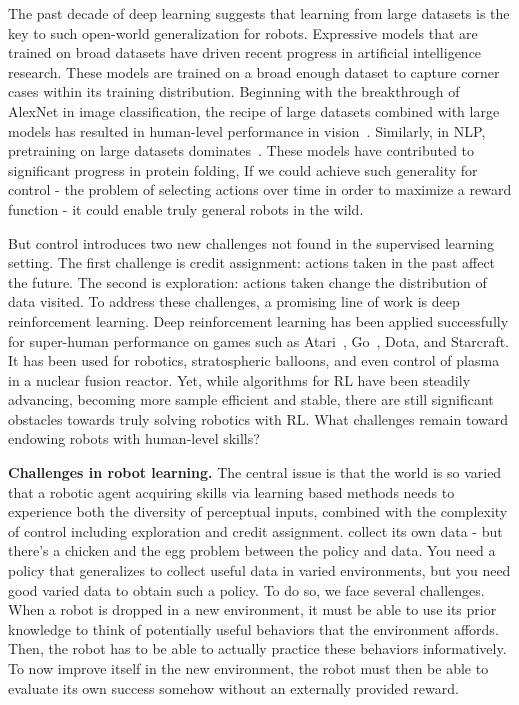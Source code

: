 The past decade of deep learning suggests that learning from large datasets is the key to such open-world generalization for robots.
Expressive models that are trained on broad datasets have driven recent progress in artificial intelligence research.
These models are trained on a broad enough dataset to capture corner cases within its training distribution.
Beginning with the breakthrough of AlexNet in image classification, the recipe of large datasets combined with large models has resulted in human-level performance in vision~\citep{krizhevsky2012imagenet}.
Similarly, in NLP, pretraining on large datasets dominates~\citep{devlin2019bert}.
These models have contributed to significant progress in protein folding, 
If we could achieve such generality for control - the problem of selecting actions over time in order to maximize a reward function - it could enable truly general robots in the wild.

But control introduces two new challenges not found in the supervised learning setting.
The first challenge is credit assignment: actions taken in the past affect the future.
The second is exploration: actions taken change the distribution of data visited.
To address these challenges, a promising line of work is deep reinforcement learning.
Deep reinforcement learning has been applied successfully for super-human performance on games such as Atari~\citep{mnih2015human}, Go~\citep{silver2016alphago}, Dota, and Starcraft.
It has been used for robotics, stratospheric balloons, and even control of plasma in a nuclear fusion reactor.
Yet, while algorithms for RL have been steadily advancing, becoming more sample efficient and stable, there are still significant obstacles towards truly solving robotics with RL.
What challenges remain toward endowing robots with human-level skills?

\vspace{5mm}

\textbf{Challenges in robot learning.} The central issue is that the world is so varied that a robotic agent acquiring skills via learning based methods needs to experience both the diversity of perceptual inputs, combined with the complexity of control including exploration and credit assignment.
collect its own data - but there’s a chicken and the egg problem between the policy and data. You need a policy that generalizes to collect useful data in varied environments, but you need good varied data to obtain such a policy. 
To do so, we face several challenges. When a robot is dropped in a new environment, it must be able to use its prior knowledge to think of potentially useful behaviors that the environment affords. Then, the robot has to be able to actually practice these behaviors informatively. To now improve itself in the new environment, the robot must then be able to evaluate its own success somehow without an externally provided reward.

